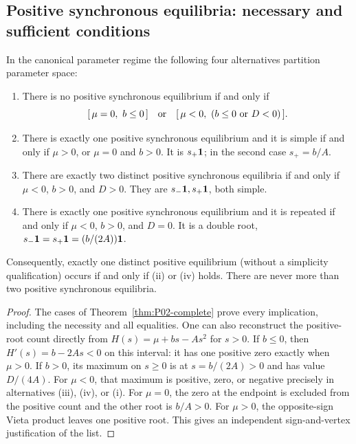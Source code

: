 \subsection{Positive synchronous equilibria: necessary and sufficient conditions}

\begin{theorem}
\label{thm:P02-positive}
In the canonical parameter regime the following four alternatives
partition parameter space:
\begin{enumerate}[label=(\roman*),leftmargin=*]
\item There is no positive synchronous equilibrium if and only if
\begin{equation}
\label{eq:P02-none}
 [\,\mu=0,\ b\le0\,]
 \quad\hbox{or}\quad
 [\,\mu<0,\ (b\le0\ \hbox{or}\ D<0)\,].
\end{equation}
\item There is exactly one positive synchronous equilibrium and it is
simple if and only if $\mu>0$, or $\mu=0$ and $b>0$.
It is $s_+\mathbf{1}$; in the second case $s_+=b/A$.
\item There are exactly two distinct positive synchronous equilibria
if and only if $\mu<0$, $b>0$, and $D>0$. They are
$s_-\mathbf{1},s_+\mathbf{1}$, both simple.
\item There is exactly one positive synchronous equilibrium and it
is repeated if and only if $\mu<0$, $b>0$, and $D=0$.
It is a double root, $s_-\mathbf{1}=s_+\mathbf{1}=(b/(2A))\mathbf{1}$.
\end{enumerate}
Consequently, exactly one distinct positive equilibrium (without a
simplicity qualification) occurs if and only if (ii) or (iv) holds.
There are never more than two positive synchronous equilibria.
\end{theorem}

\begin{proof}
The cases of Theorem~\ref{thm:P02-complete} prove every implication,
including the necessity and all equalities. One can also reconstruct
the positive-root count directly from
$H(s)=\mu+bs-As^2$ for $s>0$. If $b\le0$, then
$H'(s)=b-2As<0$ on this interval: it has one positive zero exactly
when $\mu>0$. If $b>0$, its maximum on $s\ge0$ is at
$s=b/(2A)>0$ and has value $D/(4A)$. For $\mu<0$, that maximum
is positive, zero, or negative precisely in alternatives (iii),
(iv), or (i). For $\mu=0$, the zero at the endpoint is excluded
from the positive count and the other root is $b/A>0$. For
$\mu>0$, the opposite-sign Vieta product leaves one positive root.
This gives an independent sign-and-vertex justification of the list.
\end{proof}

